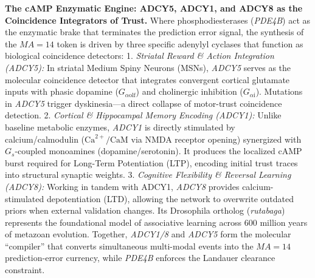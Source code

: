 \documentclass[
]{article}
\begin{document}
\textbf{The cAMP Enzymatic Engine: ADCY5, ADCY1, and ADCY8 as the
Coincidence Integrators of Trust.} Where phosphodiesterases
(\emph{PDE4B}) act as the enzymatic brake that terminates the prediction
error signal, the synthesis of the \(MA=14\) token is driven by three
specific adenylyl cyclases that function as biological coincidence
detectors: 1. \emph{Striatal Reward \& Action Integration (ADCY5):} In
striatal Medium Spiny Neurons (MSNs), \emph{ADCY5} serves as the
molecular coincidence detector that integrates convergent cortical
glutamate inputs with phasic dopamine (\(G_{\alpha\mathrm{olf}}\)) and
cholinergic inhibition (\(G_{\alpha\mathrm{i}}\)). Mutations in
\emph{ADCY5} trigger dyskinesia---a direct collapse of motor-trust
coincidence detection. 2. \emph{Cortical \& Hippocampal Memory Encoding
(ADCY1):} Unlike baseline metabolic enzymes, \emph{ADCY1} is directly
stimulated by calcium/calmodulin (\(\text{Ca}^{2+}/\text{CaM}\) via NMDA
receptor opening) synergized with \(G_s\)-coupled monoamines
(dopamine/serotonin). It produces the localized cAMP burst required for
Long-Term Potentiation (LTP), encoding initial trust traces into
structural synaptic weights. 3. \emph{Cognitive Flexibility \& Reversal
Learning (ADCY8):} Working in tandem with ADCY1, \emph{ADCY8} provides
calcium-stimulated depotentiation (LTD), allowing the network to
overwrite outdated priors when external validation changes. Its
Drosophila ortholog (\emph{rutabaga}) represents the foundational model
of associative learning across 600 million years of metazoan evolution.
Together, \emph{ADCY1/8} and \emph{ADCY5} form the molecular
``compiler'' that converts simultaneous multi-modal events into the
\(MA=14\) prediction-error currency, while \emph{PDE4B} enforces the
Landauer clearance constraint.
\end{document}
